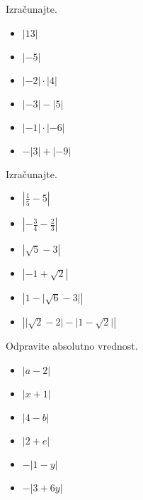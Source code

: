 


        \begin{naloga}
            Izračunajte.
            \begin{itemize}
                \item $|13|$ 
                \item $|-5|$ 
                \item $|-2|\cdot|4|$ 
                \item $|-3|-|5|$ 
                \item $|-1|\cdot|-6|$ 
                \item $-|3|+|-9|$ 
                    
            \end{itemize}
        \end{naloga}


        \begin{naloga}
            Izračunajte.
            \begin{itemize}
                \item $\left\lvert\frac{1}{5}-5\right\rvert$ 
                \item $\left\lvert-\frac{3}{4}-\frac{2}{3}\right\rvert$ 
                \item $\left\lvert\sqrt{5}-3\right\rvert$ 
                \item $\left\lvert-1+\sqrt{2}\right\rvert$ 
                \item $\left\lvert 1-\lvert\sqrt{6}-3\rvert\right\rvert$ 
                \item $\left\lvert\lvert\sqrt{2}-2\rvert-\lvert 1-\sqrt{2}\rvert\right\rvert$ 
                    
            \end{itemize}
        \end{naloga}



        \begin{naloga}
            Odpravite absolutno vrednost.
            \begin{itemize}

                \item $\left\lvert a-2\right\rvert$ 
                \item $\left\lvert x+1\right\rvert$ 
                \item $\left\lvert 4-b\right\rvert$ 
                \item $\left\lvert 2+e\right\rvert$ 
                \item $-\left\lvert 1-y\right\rvert$ 
                \item $-\left\lvert 3+6y\right\rvert$ 
                    
            \end{itemize}
        \end{naloga}


